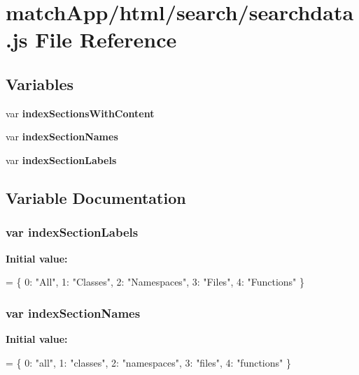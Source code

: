 \section{match\+App/html/search/searchdata.js File Reference}
\label{searchdata_8js}
\subsection*{Variables}
\begin{DoxyCompactItemize}
\item 
var {\bf index\+Sections\+With\+Content}
\item 
var {\bf index\+Section\+Names}
\item 
var {\bf index\+Section\+Labels}
\end{DoxyCompactItemize}


\subsection{Variable Documentation}
\subsubsection[{index\+Section\+Labels}]{\setlength{\rightskip}{0pt plus 5cm}var index\+Section\+Labels}\label{searchdata_8js_a529972e449c82dc118cbbd3bcf50c44d}
{\bfseries Initial value\+:}
\begin{DoxyCode}
=
\{
  0: \textcolor{stringliteral}{"All"},
  1: \textcolor{stringliteral}{"Classes"},
  2: \textcolor{stringliteral}{"Namespaces"},
  3: \textcolor{stringliteral}{"Files"},
  4: \textcolor{stringliteral}{"Functions"}
\}
\end{DoxyCode}
\subsubsection[{index\+Section\+Names}]{\setlength{\rightskip}{0pt plus 5cm}var index\+Section\+Names}\label{searchdata_8js_a77149ceed055c6c6ce40973b5bdc19ad}
{\bfseries Initial value\+:}
\begin{DoxyCode}
=
\{
  0: \textcolor{stringliteral}{"all"},
  1: \textcolor{stringliteral}{"classes"},
  2: \textcolor{stringliteral}{"namespaces"},
  3: \textcolor{stringliteral}{"files"},
  4: \textcolor{stringliteral}{"functions"}
\}
\end{DoxyCode}
